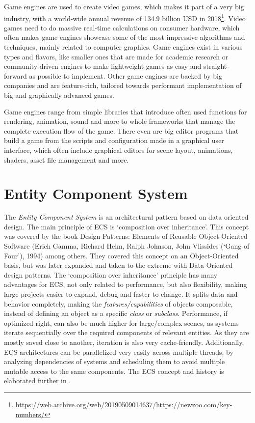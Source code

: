
Game engines are used to create video games, which makes it part of a very big industry, with a world-wide annual revenue of 134.9 billion USD in 2018\footnote{\url{https://web.archive.org/web/20190509014637/https://newzoo.com/key-numbers/}}. Video games need to do massive real-time calculations on consumer hardware, which often makes game engines showcase some of the most impressive algorithms and techniques, mainly related to computer graphics. Game engines exist in various types and flavors, like smaller ones that are made for academic research or community-driven engines to make lightweight games as easy and straight-forward as possible to implement. Other game engines are backed by big companies and are feature-rich, tailored towards performant implementation of big and graphically advanced games.

Game engines range from simple libraries that introduce often used functions for rendering, animation, sound and more to whole frameworks that manage the complete execution flow of the game. There even are big editor programs that build a game from the scripts and configuration made in a graphical user interface, which often include graphical editors for scene layout, animations, shaders, asset file management and more.

\section*{Entity Component System}

The \textit{Entity Component System} is an architectural pattern based on data oriented design. The main principle of ECS is `composition over inheritance'. This concept was covered by the book \textsf{Design Patterns: Elements of Reusable Object-Oriented Software} (Erich Gamma, Richard Helm, Ralph Johnson, John Vlissides (`Gang of Four'), 1994) among others. They covered this concept on an Object-Oriented basis, but was later expanded and taken to the extreme with Data-Oriented design patterns. The `composition over inheritance' principle has many advantages for ECS, not only related to performance, but also flexibility, making large projects easier to expand, debug and faster to change. It splits data and behavior completely, making the \textit{features/capabilities} of objects composable, instead of defining an object as a specific \textit{class} or \textit{subclass}. Performance, if optimized right, can also be much higher for large/complex scenes, as systems iterate sequentially over the required components of relevant entities. As they are mostly saved close to another, iteration is also very cache-friendly. Additionally, ECS architectures can be parallelized very easily across multiple threads, by analyzing dependencies of systems and scheduling them to avoid multiple mutable access to the same components. The ECS concept and history is elaborated further in .

